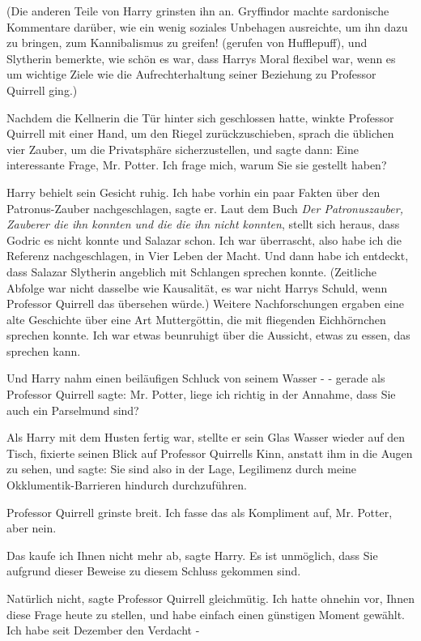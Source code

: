 (Die anderen Teile von Harry grinsten ihn an. Gryffindor machte sardonische
Kommentare darüber, wie ein wenig soziales Unbehagen ausreichte, um ihn dazu zu
bringen, zum Kannibalismus zu greifen! (gerufen von Hufflepuff), und Slytherin
bemerkte, wie schön es war, dass Harrys Moral flexibel war, wenn es um wichtige
Ziele wie die Aufrechterhaltung seiner Beziehung zu Professor Quirrell ging.)

Nachdem die Kellnerin die Tür hinter sich geschlossen hatte, winkte Professor
Quirrell mit einer Hand, um den Riegel zurückzuschieben, sprach die üblichen
vier Zauber, um die Privatsphäre sicherzustellen, und sagte dann: \glqq{}Eine
interessante Frage, Mr. Potter. Ich frage mich, warum Sie sie gestellt haben?\grqq{}

Harry behielt sein Gesicht ruhig. \glqq{}Ich habe vorhin ein paar Fakten über den
Patronus-Zauber nachgeschlagen\grqq{}, sagte er. \glqq{}Laut dem Buch \emph{Der
Patronuszauber, Zauberer die ihn konnten und die die ihn nicht konnten}, stellt
sich heraus, dass Godric es nicht konnte und Salazar schon. Ich war überrascht,
also habe ich die Referenz nachgeschlagen, in Vier Leben der Macht. Und dann
habe ich entdeckt, dass Salazar Slytherin angeblich mit Schlangen sprechen
konnte.\grqq{} (Zeitliche Abfolge war nicht dasselbe wie Kausalität, es war nicht
Harrys Schuld, wenn Professor Quirrell das übersehen würde.) \glqq{}Weitere
Nachforschungen ergaben eine alte Geschichte über eine Art Muttergöttin, die mit
fliegenden Eichhörnchen sprechen konnte. Ich war etwas beunruhigt über die
Aussicht, etwas zu essen, das sprechen kann.\grqq{}

Und Harry nahm einen beiläufigen Schluck von seinem Wasser - - gerade als
Professor Quirrell sagte: \glqq{}Mr. Potter, liege ich richtig in der Annahme,
dass Sie auch ein Parselmund sind?\grqq{}

Als Harry mit dem Husten fertig war, stellte er sein Glas Wasser wieder auf den
Tisch, fixierte seinen Blick auf Professor Quirrells Kinn, anstatt ihm in die
Augen zu sehen, und sagte: \glqq{}Sie sind also in der Lage, Legilimenz durch
meine Okklumentik-Barrieren hindurch durchzuführen.\grqq{}

Professor Quirrell grinste breit. \glqq{}Ich fasse das als Kompliment auf, Mr.
Potter, aber nein.\grqq{}

\glqq{}Das kaufe ich Ihnen nicht mehr ab\grqq{}, sagte Harry. \glqq{}Es ist
unmöglich, dass Sie aufgrund dieser Beweise zu diesem Schluss gekommen sind.\grqq{}

\glqq{}Natürlich nicht\grqq{}, sagte Professor Quirrell gleichmütig. \glqq{}Ich
hatte ohnehin vor, Ihnen diese Frage heute zu stellen, und habe einfach einen
günstigen Moment gewählt. Ich habe seit Dezember den Verdacht -\grqq{}

